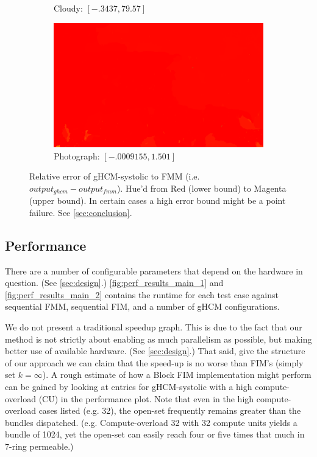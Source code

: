 \documentclass[11pt]{article}       %
\begin{document}
\begin{figure}
\begin{subfigure}[b]{.4\columnwidth}
		\caption{Cloudy: $[-.3437, 79.57]$}
	\end{subfigure}
	\begin{subfigure}[b]{.4\columnwidth}
		\includegraphics[width=\textwidth]{Figures/diff_photograph}
		\caption{Photograph: $[-.0009155, 1.501]$}
	\end{subfigure}
	\caption{Relative error of gHCM-systolic to FMM (i.e. $output_{ghcm} - output_{fmm}$). Hue'd from Red (lower bound) to Magenta (upper bound). In certain cases a high error bound might be a point failure. See \autoref{sec:conclusion}.}
	\label{fig:rel_error_output}
\end{figure}



\subsection{Performance}

There are a number of configurable parameters that depend on the hardware in question. (See \autoref{sec:design}.) \autoref{fig:perf_results_main_1} and \autoref{fig:perf_results_main_2} contains the runtime for each test case against sequential FMM, sequential FIM, and a number of gHCM configurations.

We do not present a traditional speedup graph. This is due to the fact that our method is not strictly about enabling as much parallelism as possible, but making better use of available hardware. (See \autoref{sec:design}.) That said, give the structure of our approach we can claim that the speed-up is no worse than FIM's (simply set $k=\infty$). A rough estimate of how a Block FIM implementation might perform can be gained by looking at entries for gHCM-systolic with a high compute-overload (CU) in the performance plot. Note that even in the high compute-overload cases listed (e.g. 32), the open-set frequently remains greater than the bundles dispatched. (e.g. Compute-overload 32 with 32 compute units yields a bundle of 1024, yet the open-set can easily reach four or five times that much in 7-ring permeable.)
\end{document}

